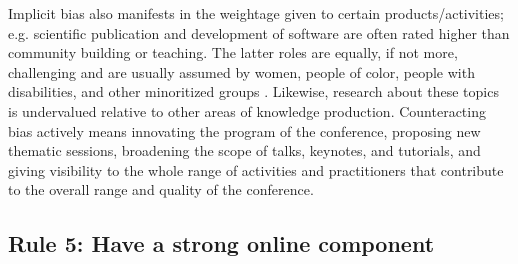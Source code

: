 \documentclass[10pt,letterpaper]{article}
\begin{document}

Implicit bias also manifests in the weightage given to certain products/activities; e.g. scientific publication and development of software are often rated higher than community building or teaching. 
The latter roles are equally, if not more, challenging and are usually assumed by women, people of color, people with disabilities, and other minoritized groups \cite{cheng2020x+, burfordHomelinessMeantHaving2020}. 
Likewise, research about these topics is undervalued relative to other areas of knowledge production. 
Counteracting bias actively means innovating the program of the conference, proposing new thematic sessions, broadening the scope of talks, keynotes, and tutorials, and giving visibility to the whole range of activities and practitioners that contribute to the overall range and quality of the conference. 


\subsection*{Rule 5: Have a strong online component} 
\label{rule_online}
\end{document}
